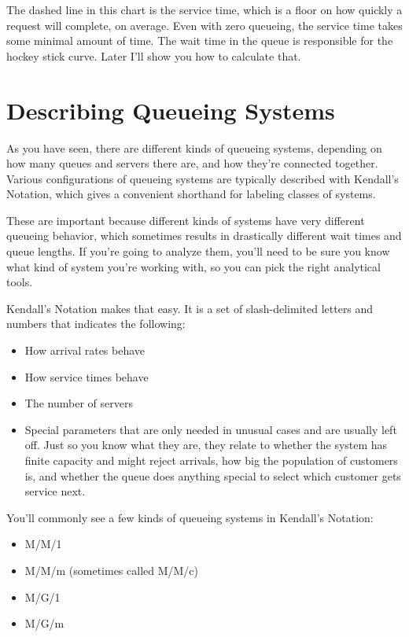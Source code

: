 \documentclass{vivid_layout_pdf}
\begin{document}
The dashed line in this chart is the service time, which is a floor on how quickly a request will complete, on average. Even with zero queueing, the service time takes some minimal amount of time. The wait time in the queue is responsible for the hockey stick curve. Later I'll show you how to calculate that.

\section{Describing Queueing Systems}

As you have seen, there are different kinds of queueing systems, depending on how many queues and servers there are, and how they're connected together. Various configurations of queueing systems are typically described with Kendall's Notation, which gives a convenient shorthand for labeling classes of systems.

These are important because different kinds of systems have very different queueing behavior, which sometimes results in drastically different wait times and queue lengths. If you're going to analyze them, you'll need to be sure you know what kind of system you're working with, so you can pick the right analytical tools.

Kendall's Notation makes that easy. It is a set of slash-delimited letters and numbers that indicates the following:

\begin{itemize}
\item How arrival rates behave
\item How service times behave
\item The number of servers
\item Special parameters that are only needed in unusual cases and are usually left off. Just so you know what they are, they relate to whether the system has finite capacity and might reject arrivals, how big the population of customers is, and whether the queue does anything special to select which customer gets service next.
\end{itemize}

You'll commonly see a few kinds of queueing systems in Kendall's Notation:

\begin{itemize}
\item M/M/1
\item M/M/m (sometimes called M/M/c)
\item M/G/1
\item M/G/m
\end{itemize}
\end{document}

